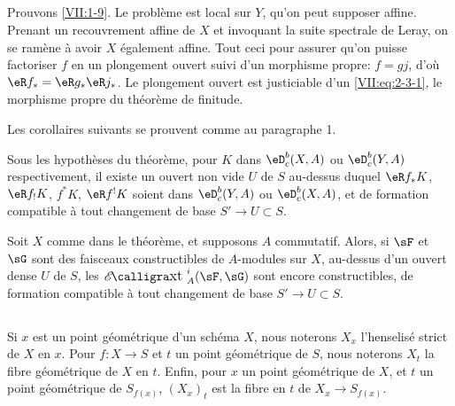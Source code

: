 \subsection{}\label{VII:2-8}

Prouvons \ref{VII:1-9}. Le problème est local sur $Y$, qu'on peut supposer 
affine. Prenant un recouvrement affine de $X$ et invoquant la suite spectrale 
de Leray, on se ramène à avoir $X$ également affine. Tout ceci pour 
assurer qu'on puisse factoriser $f$ en un plongement ouvert suivi d'un 
morphisme propre: $f=g j$, d'où $\eR f_\ast = \eR g_\ast \eR j_\ast$. Le 
plongement ouvert est justiciable d'un \eqref{VII:eq:2-3-1}, le morphisme 
propre du théorème de finitude. 

Les corollaires suivants se prouvent comme au paragraphe 1. 





\begin{corollary_}\label{VII:2-9}
Sous les hypothèses du théorème, pour $K$ dans $\eD_c^b(X,A)$ ou 
$\eD_c^b(Y,A)$ respectivement, il existe un ouvert non vide $U$ de $S$ 
au-dessus duquel $\eR f_\ast K$, $\eR f_! K$, $f^\ast K$, $\eR f^! K$ soient 
dans $\eD_c^b(Y,A)$ ou $\eD_c^b(X,A)$, et de formation compatible à tout 
changement de base $S' \to U\subset S$. 
\end{corollary_}





\begin{corollary_}\label{VII:2-10}
Soit $X$ comme dans le théorème, et supposons $A$ commutatif. Alors, si 
$\sF$ et $\sG$ sont des faisceaux constructibles de $A$-modules sur $X$, 
au-dessus d'un ouvert dense $U$ de $S$, les $\Ext_A^i(\sF,\sG)$ sont encore 
constructibles, de formation compatible à tout changement de base 
$S' \to U\subset S$. 
\end{corollary_}





\subsection{}\label{VII:2-11}

Si $x$ est un point géométrique d'un schéma $X$, nous noterons $X_x$ 
l'henselisé strict de $X$ en $x$. Pour $f:X\to S$ et $t$ un point 
géométrique de $S$, nous noterons $X_t$ la fibre géométrique de $X$ en 
$t$. Enfin, pour $x$ un point géométrique de $X$, et $t$ un point 
géométrique de $S_{f(x)}$, $(X_x)_t$ est la fibre en $t$ de 
$X_x \to S_{f(x)}$. 





